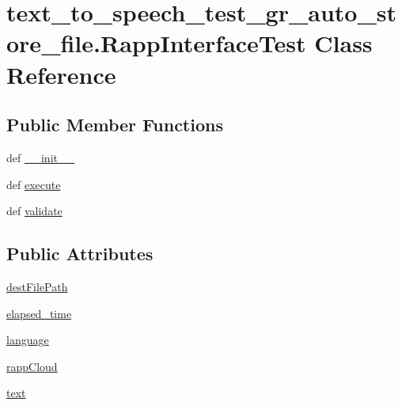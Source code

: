 \hypertarget{classtext__to__speech__test__gr__auto__store__file_1_1RappInterfaceTest}{\section{text\-\_\-to\-\_\-speech\-\_\-test\-\_\-gr\-\_\-auto\-\_\-store\-\_\-file.\-Rapp\-Interface\-Test Class Reference}
\label{classtext__to__speech__test__gr__auto__store__file_1_1RappInterfaceTest}
}
\subsection*{Public Member Functions}
\begin{DoxyCompactItemize}
\item 
def \hyperlink{classtext__to__speech__test__gr__auto__store__file_1_1RappInterfaceTest_a0469212864456f5f254a1e4cd9512a7c}{\-\_\-\-\_\-init\-\_\-\-\_\-}
\item 
def \hyperlink{classtext__to__speech__test__gr__auto__store__file_1_1RappInterfaceTest_aecd96556542a4c77348c11ff1ac61309}{execute}
\item 
def \hyperlink{classtext__to__speech__test__gr__auto__store__file_1_1RappInterfaceTest_a3ca2c89b07a4e228722e6f0fd149aaad}{validate}
\end{DoxyCompactItemize}
\subsection*{Public Attributes}
\begin{DoxyCompactItemize}
\item 
\hyperlink{classtext__to__speech__test__gr__auto__store__file_1_1RappInterfaceTest_a206e62b58b96f63b93392dfc06bdc9e1}{dest\-File\-Path}
\item 
\hyperlink{classtext__to__speech__test__gr__auto__store__file_1_1RappInterfaceTest_a14ef81da2a506a1687a2d600f7c9c522}{elapsed\-\_\-time}
\item 
\hyperlink{classtext__to__speech__test__gr__auto__store__file_1_1RappInterfaceTest_a5a6ca4dd4fc904d093816c96f4eda1ee}{language}
\item 
\hyperlink{classtext__to__speech__test__gr__auto__store__file_1_1RappInterfaceTest_a6908d21d5911fba4de16763dbc7c4643}{rapp\-Cloud}
\item 
\hyperlink{classtext__to__speech__test__gr__auto__store__file_1_1RappInterfaceTest_a14c2256010240b7ad878cd6f6504bef3}{text}
\end{DoxyCompactItemize}


